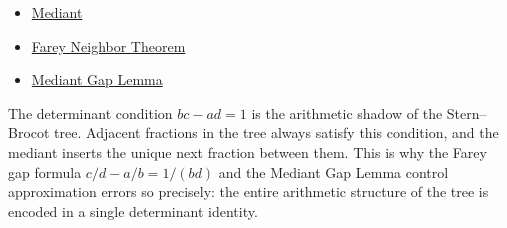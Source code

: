 \begin{dependencies}
\begin{itemize}
  \item \hyperref[def:mediant]{Mediant}
  \item \hyperref[thm:farey-neighbor-theorem]{Farey Neighbor Theorem}
  \item \hyperref[lem:mediant-gap]{Mediant Gap Lemma}
\end{itemize}
\end{dependencies}

\begin{remark*}
The determinant condition $bc - ad = 1$ is the arithmetic shadow of the
Stern--Brocot tree.  Adjacent fractions in the tree always satisfy this
condition, and the mediant inserts the unique next fraction between them.
This is why the Farey gap formula $c/d - a/b = 1/(bd)$ and the Mediant
Gap Lemma control approximation errors so precisely: the entire arithmetic
structure of the tree is encoded in a single determinant identity.
\end{remark*}
